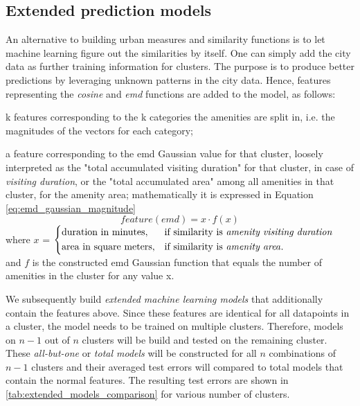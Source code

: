 \subsection{Extended prediction models}
\label{evaluation:machine_learning_better}
An alternative to building urban measures and similarity functions is to let machine learning figure out the similarities by itself. One can simply add the city data as further training information for clusters. The purpose is to produce better predictions by leveraging unknown patterns in the city data. Hence, features representing the \textit{cosine} and \textit{emd} functions are added to the model, as follows: 
\begin{romanlist}
	\item k features corresponding to the k categories the amenities are split in, i.e. the magnitudes of the vectors for each category;
	\item a feature corresponding to the emd Gaussian value for that cluster, loosely interpreted as the "total accumulated visiting duration" for that cluster, in case of \textit{visiting duration}, or the "total accumulated area" among all amenities in that cluster, for the amenity area; mathematically it is expressed in Equation \cref{eq:emd_gaussian_magnitude}
	\begin{equation}
		feature(emd)=x \cdot f(x)
		\label{eq:emd_gaussian_magnitude}
	\end{equation}
	{\centering
	where $x$ = 
	$
	\begin{dcases}
	\text{duration in minutes}, & \text{if similarity is \textit{amenity visiting duration}} \\
	\text{area in square meters}, & \text{if similarity is \textit{amenity area}}.
	\end{dcases}
	$ \\
	and $f$ is the constructed emd Gaussian function that equals the number of amenities in the cluster for any value x.}
\end{romanlist}

We subsequently build \textit{extended machine learning models} that additionally contain the features above. Since these features are identical for all datapoints in a cluster, the model needs to be trained on multiple clusters. Therefore, models on $n-1$ out of $n$ clusters will be build and tested on the remaining cluster. These \textit{all-but-one} or \textit{total models} will be constructed for all $n$ combinations of $n-1$ clusters and their averaged test errors will compared to total models that contain the normal features. The resulting test errors are shown in \cref{tab:extended_models_comparison} for various number of clusters. 

